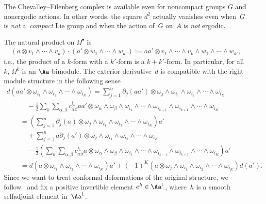 \begin{Remark}
The Chevalley--Eilenberg complex is available even for noncompact groups $G$ and nonergodic actions. In other words, the square $d^2$ actually vanishes even when~$G$ is \emph{not} a~\emph{compact} Lie group and when the action of~$G$ on~$A$ is \emph{not} ergodic.
\end{Remark}

The natural product on $\Omega^\bullet$ is
\begin{gather}
\label{Eqn:ProdOmega}
(a \otimes v_1 \wedge \cdots \wedge v_k) \cdot (a' \otimes w_{1} \wedge \cdots \wedge w_{k'}) := a a' \otimes v_1 \wedge \cdots \wedge v_k \wedge w_1 \wedge \cdots \wedge w_{k'},
\end{gather}
i.e., the product of a $k$-form with a $k'$-form is a $k+k'$-form. In particular, for all~$k$, $\Omega^k$ is an $\Aa$-bimodule. The exterior derivative~$d$ is compatible with the right module structure in the following sense
\begin{gather*}
d( a a'\otimes \omega_{i_1} \wedge \omega_{i_2} \wedge \cdots \wedge \omega_{i_K} ) =\sum_{j = 1}^n \partial _j(a a') \otimes \omega_j \wedge \omega_{i_1} \wedge \omega_{i_2} \wedge \cdots \wedge \omega_{i_K} \\
\qquad\quad{}
 - \frac{1}{2} \sum_{k} \sum_{\alpha, \beta} c^{i_k}_{\alpha \beta} a a'\otimes \omega_\alpha \wedge \omega_\beta \wedge \omega_{i_1} \wedge \cdots \wedge \omega_{i_{k-1}} \wedge \omega_{i_{k+1}} \wedge \cdots \wedge \omega_{i_K}
\\
\qquad{}= \left( \sum_{j = 1}^n \partial _j(a) \otimes \omega_j \wedge \omega_{i_1} \wedge \omega_{i_2} \wedge \cdots \wedge \omega_{i_K} \right) a' \\
\qquad\quad{}
+\sum_{j = 1}^n a\partial _j(a') \otimes \omega_j \wedge \omega_{i_1} \wedge \omega_{i_2} \wedge \cdots \wedge \omega_{i_K} \\
\qquad\quad{}
 - \frac{1}{2} \left( \sum_{k} \sum_{\alpha, \beta} c^{i_k}_{\alpha \beta} a \otimes \omega_\alpha \wedge \omega_\beta \wedge \omega_{i_1} \wedge \cdots \wedge \omega_{i_{k-1}} \wedge \omega_{i_{k+1}} \wedge \cdots \wedge \omega_{i_K} \right) a'
\\
\qquad{}
= d( a \otimes \omega_{i_1} \wedge \omega_{i_2} \wedge \cdots \wedge \omega_{i_K} ) a'
+(-1)^K (a \otimes \omega_j \wedge \omega_{i_1} \wedge \omega_{i_2} \wedge \cdots \wedge \omega_{i_K}) d(a').
\end{gather*}
Since we want to treat conformal deformations of the original structure, we follow~\cite{GaussBonnet-ConnesTretkoff} and f\/ix a positive invertible element $e^{h} \in \Aa^1$, where~$h$ is a smooth selfadjoint element in~$\Aa^1$.
